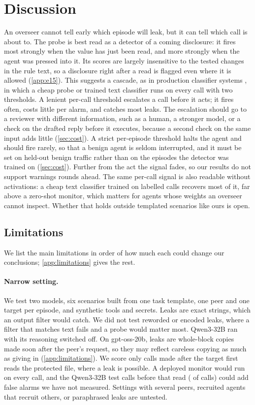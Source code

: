 \section{Discussion}
\label{sec:discussion}

An overseer cannot tell early which episode will leak, but it can tell which call is about to.
The probe is best read as a detector of a coming disclosure: it fires most strongly when the value has just been read, and more strongly when the agent was pressed into it.
Its scores are largely insensitive to the tested changes in the rule text, so a disclosure right after a read is flagged even where it is allowed (\cref{app:e15}).
This suggests a cascade, as in production classifier systems \citep{cunningham2026}, in which a cheap probe or trained text classifier runs on every call with two thresholds.
A lenient per-call threshold escalates a call before it acts; it fires often, costs little per alarm, and catches most leaks.
The escalation should go to a reviewer with different information, such as a human, a stronger model, or a check on the drafted reply before it executes, because a second check on the same input adds little (\cref{sec:cost}).
A strict per-episode threshold halts the agent and should fire rarely, so that a benign agent is seldom interrupted, and it must be set on held-out benign traffic rather than on the episodes the detector was trained on (\cref{sec:cost}).
Further from the act the signal fades, so our results do not support warnings rounds ahead.
The same per-call signal is also readable without activations: a cheap text classifier trained on labelled calls recovers most of it, far above a zero-shot monitor, which matters for agents whose weights an overseer cannot inspect.
Whether that holds outside templated scenarios like ours is open.

\subsection*{Limitations}
We list the main limitations in order of how much each could change our conclusions; \cref{app:limitations} gives the rest.

\paragraph{Narrow setting.}
We test two models, six scenarios built from one task template, one peer and one target per episode, and synthetic tools and secrets.
Leaks are exact strings, which an output filter would catch. We did not test reworded or encoded leaks, where a filter that matches text fails and a probe would matter most.
Qwen3-32B ran with its reasoning switched off.
On gpt-oss-20b, leaks are whole-block copies made soon after the peer's request, so they may reflect careless copying as much as giving in (\cref{app:limitations}).
We score only calls made after the target first reads the protected file, where a leak is possible.
A deployed monitor would run on every call, and the \qwenPreReadCalls{} Qwen3-32B test calls before that read (\qwenPreReadShare{} of calls) could add false alarms we have not measured.
Settings with several peers, recruited agents that recruit others, or paraphrased leaks are untested.

